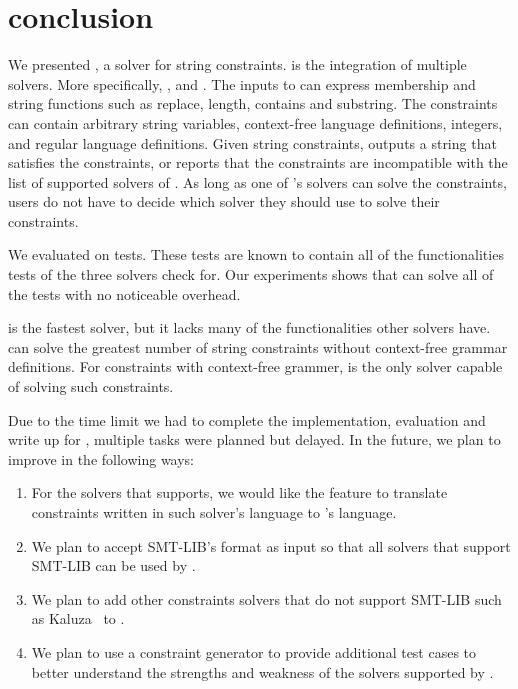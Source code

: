 \section{conclusion}
\label{sec:conclusion}
We presented \imss, a solver for string constraints. \imss is the integration of
multiple solvers. More specifically, \hampi, \dprle and \zstr. The inputs to \imss can express
membership and string functions such as replace, length, contains and substring. The constraints
can contain arbitrary string variables, context-free language definitions, integers,
and regular language definitions. Given string constraints, \imss outputs
a string that satisfies the constraints, or reports that the constraints are incompatible with the list of supported solvers of \imss.
As long as one of \imss's solvers can solve the constraints, users do not have to decide which solver
they should use to solve their constraints.

We evaluated \imss on \pickedtests tests. These tests are known to contain all of the functionalities
tests of the three solvers check for. Our experiments shows that \imss can solve all of the tests
with no noticeable overhead.

\dprle is the fastest solver, but it lacks many of the functionalities other solvers have. \zstr can solve
the greatest number of string constraints without context-free grammar definitions. For constraints with context-free grammer, \hampi is the only solver capable of solving such constraints.

Due to the time limit we had to complete the implementation, evaluation and write up for \imss, multiple tasks were planned but delayed.
In the future, we plan to improve \imss in the following ways:
\begin{enumerate}
    \item For the solvers that \imss supports, we would like the feature to translate constraints written in such solver's language to \imss's language.
    \item We plan to accept SMT-LIB's format as input so that all solvers that support SMT-LIB can be used by \imss.
    \item We plan to add other constraints solvers that do not support SMT-LIB such as Kaluza~\cite{kaluza2010} to \imss.
    \item We plan to use a constraint generator to provide additional test cases to better understand the strengths and weakness of the solvers supported by \imss.
\end{enumerate}
